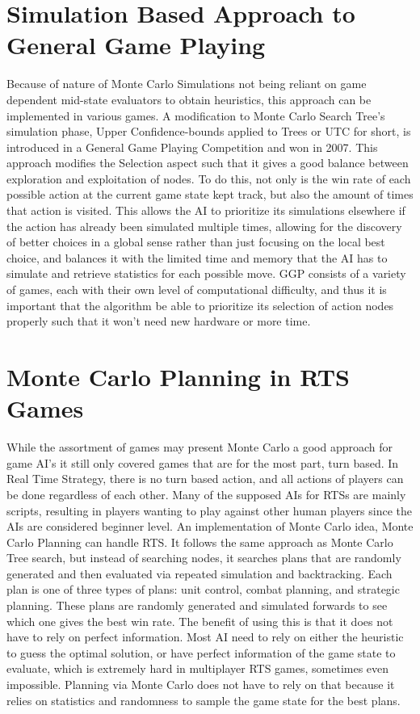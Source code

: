 \documentclass[11pt]{article}
\begin{document}
\section{Simulation Based Approach to General Game Playing}

Because of nature of Monte Carlo Simulations not being reliant on game dependent mid-state evaluators to obtain heuristics, this approach can be implemented in various games. A modification to Monte Carlo Search Tree’s simulation phase, Upper Confidence-bounds applied to Trees or UTC for short, is introduced in a General Game Playing Competition and won in 2007. \cite{finnsson2008simulation} This approach modifies the Selection aspect such that it gives a good balance between exploration and exploitation of nodes. To do this, not only is the win rate of each possible action at the current game state kept track, but also the amount of times that action is visited. This allows the AI to prioritize its simulations elsewhere if the action has already been simulated multiple times, allowing for the discovery of better choices in a global sense rather than just focusing on the local best choice, and balances it with the limited time and memory that the AI has to simulate and retrieve statistics for each possible move. GGP consists of a variety of games, each with their own level of computational difficulty, and thus it is important that the algorithm be able to prioritize its selection of action nodes properly such that it won’t need new hardware or more time.

\section{Monte Carlo Planning in RTS Games}

While the assortment of games may present Monte Carlo a good approach for game AI’s it still only covered games that are for the most part, turn based. In Real Time Strategy, there is no turn based action, and all actions of players can be done regardless of each other. Many of the supposed AIs for RTSs are mainly scripts, resulting in players wanting to play against other human players since the AIs are considered beginner level. An implementation of Monte Carlo idea, Monte Carlo Planning can handle RTS. It follows the same approach as Monte Carlo Tree search, but instead of searching nodes, it searches plans that are randomly generated and then evaluated via repeated simulation and backtracking. Each plan is one of three types of plans: unit control, combat planning, and strategic planning. \cite{chung2005monte} These plans are randomly generated and simulated forwards to see which one gives the best win rate. The benefit of using this is that it does not have to rely on perfect information. Most AI need to rely on either the heuristic to guess the optimal solution, or have perfect information of the game state to evaluate, which is extremely hard in multiplayer RTS games, sometimes even impossible. Planning via Monte Carlo does not have to rely on that because it relies on statistics and randomness to sample the game state for the best plans.
\end{document}
